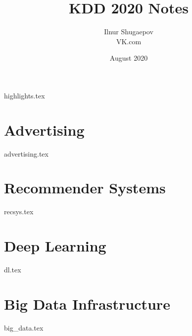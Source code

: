 \documentclass[openany,11pt]{book}
\title{KDD 2020 Notes}
\author{Ilnur Shugaepov \\ VK.com}
\date{August 2020}
\begin{document}
\maketitle
\setcounter{tocdepth}{0}
\small{\tableofcontents}
\newpage

{highlights.tex}

\newpage
\part{Advertising}
{advertising.tex}

\newpage
\part{Recommender Systems}
{recsys.tex}

\newpage
\part{Deep Learning}
{dl.tex}

\newpage
\part{Big Data Infrastructure}
{big_data.tex}
\end{document}
